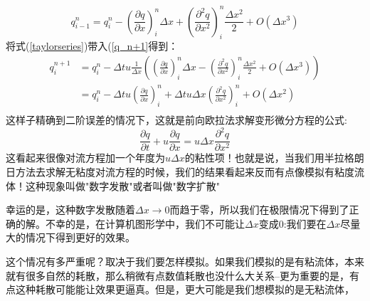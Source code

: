 \documentclass{article}
\begin{document}
\begin{equation}
q^n_{i-1}=q_i^n-\left (\frac{\partial{q}}{\partial{x}}\right)^n_i\Delta{x}+\left(\frac{\partial^2{q}}{\partial{x}^2}\right)^n_i\frac{\Delta{x}^2}{2}+O(\Delta{x}^3) \label{taylorseries}
\end{equation}
将式(\ref{taylorseries})带入(\ref{q_n+1}得到：
\begin{equation}
\begin{aligned}
q_i^{n+1}&=q_i^n-\Delta{t}u\frac{1}{\Delta{x}}\left(\left(\frac{\partial{q}}{\partial{x}}\right)^n_i\Delta{x}-\left(\frac{\partial^2{q}}{\partial{x}^2}\right)^n_i\frac{\Delta{x}^2}{2}+O(\Delta{x^3})\right) \\
&=q_i^n-\Delta{t}u\left(\frac{\partial{q}}{\partial{x}}\right)^n_i+\Delta{t}u\Delta{x}\left(\frac{\partial^2{q}}{\partial{x}^2}\right)^n_i+O(\Delta{x}^2) \\
\end{aligned}
\end{equation}
这样子精确到二阶误差的情况下，这就是前向欧拉法求解变形微分方程的公式:
\begin{equation}
\frac{\partial{q}}{\partial{t}}+u\frac{\partial{q}}{\partial{x}}=u\Delta{x}\frac{\partial^2{q}}{\partial{x}^2}
\end{equation}
这看起来很像对流方程加一个年度为$u\Delta{x}$的粘性项！也就是说，当我们用半拉格朗日方法去求解无粘度对流方程的时候，我们的结果看起来反而有点像模拟有粘度流体！这种现象叫做"数字发散"或者叫做"数字扩散"
\par
幸运的是，这种数字发散随着$\Delta{x}\to{0}$而趋于零，所以我们在极限情况下得到了正确的解。不幸的是，在计算机图形学中，我们不可能让$\Delta{x}$变成0:我们要在$\Delta{x}$尽量大的情况下得到更好的效果。
\par
这个情况有多严重呢？取决于我们要怎样模拟。如果我们模拟的是有粘流体，本来就有很多自然的耗散，那么稍微有点数值耗散也没什么大关系--更为重要的是，有点这种耗散可能能让效果更逼真。但是，更大可能是我们想模拟的是无粘流体，
\end{document}
